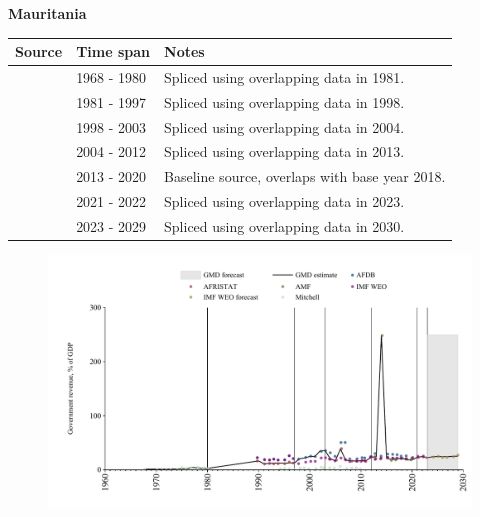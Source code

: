 \documentclass[12pt,a4paper,landscape]{article}
\begin{document}
\begin{adjustbox}{max totalsize={\paperwidth}{\paperheight},center}
\begin{minipage}[t][\textheight][t]{\textwidth}
\vspace*{0.5cm}
{}
\begin{center}
{\Large\bfseries Mauritania}
\end{center}
\vspace{0.5cm}
\begin{table}[H]
\centering
\small
\begin{tabular}{|l|l|l|}
\hline
\textbf{Source} & \textbf{Time span} & \textbf{Notes} \\
\hline
\rowcolor{white}\cite{Mitchell}& 1968 - 1980 &Spliced using overlapping data in 1981.\\
\rowcolor{lightgray}\cite{AFRISTAT}& 1981 - 1997 &Spliced using overlapping data in 1998.\\
\rowcolor{white}\cite{AFDB}& 1998 - 2003 &Spliced using overlapping data in 2004.\\
\rowcolor{lightgray}\cite{AFRISTAT}& 2004 - 2012 &Spliced using overlapping data in 2013.\\
\rowcolor{white}\cite{AMF}& 2013 - 2020 &Baseline source, overlaps with base year 2018.\\
\rowcolor{lightgray}\cite{AFRISTAT}& 2021 - 2022 &Spliced using overlapping data in 2023.\\
\rowcolor{white}\cite{IMF_WEO_forecast}& 2023 - 2029 &Spliced using overlapping data in 2030.\\
\hline
\end{tabular}
\end{table}
\begin{figure}[H]
\centering
\includegraphics[width=\textwidth,height=0.6\textheight,keepaspectratio]{graphs/MRT_govrev_GDP.pdf}
\end{figure}
\end{minipage}
\end{adjustbox}
\end{document}

